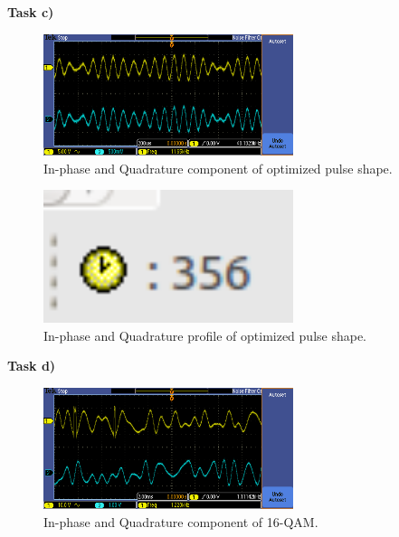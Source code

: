 \documentclass{article}
\begin{document}
\pagebreak
\textbf{Task c)}

\begin{figure}[h]
  \begin{center}
    \includegraphics[width=0.65\textwidth]{img/task_c_oscilloscope.png}
    \caption{In-phase and Quadrature component of optimized pulse shape.}
  \end{center}
\end{figure}

\begin{figure}[h]
  \begin{center}
    \includegraphics[width=0.65\textwidth]{img/task_c_profile.png}
    \caption{In-phase and Quadrature profile of optimized pulse shape.}
  \end{center}
\end{figure}

\pagebreak
\textbf{Task d)}

\begin{figure}[h]
  \begin{center}
    \includegraphics[width=0.65\textwidth]{img/task_d_oscilloscope.png}
    \caption{In-phase and Quadrature component of 16-QAM.}
  \end{center}
\end{figure}
\end{document}

